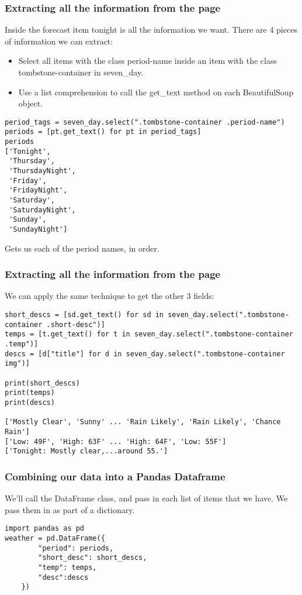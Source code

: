\begin{frame}[fragile]\frametitle{Extracting all the information from the page}
Inside the forecast item tonight is all the information we want. There are 4 pieces of information we can extract:
     \begin{itemize}
    \item    Select all items with the class period-name inside an item with the class tombstone-container in seven\_day.
    \item        Use a list comprehension to call the get\_text method on each BeautifulSoup object.
	    \end{itemize}
	                \begin{lstlisting}
period_tags = seven_day.select(".tombstone-container .period-name")
periods = [pt.get_text() for pt in period_tags]
periods
['Tonight',
 'Thursday',
 'ThursdayNight',
 'Friday',
 'FridayNight',
 'Saturday',
 'SaturdayNight',
 'Sunday',
 'SundayNight']
\end{lstlisting}
Gets us each of the period names, in order.
\end{frame}


\begin{frame}[fragile]\frametitle{Extracting all the information from the page}
We can apply the same technique to get the other 3 fields:

	                \begin{lstlisting}
short_descs = [sd.get_text() for sd in seven_day.select(".tombstone-container .short-desc")]
temps = [t.get_text() for t in seven_day.select(".tombstone-container .temp")]
descs = [d["title"] for d in seven_day.select(".tombstone-container img")]

print(short_descs)
print(temps)
print(descs)

['Mostly Clear', 'Sunny' ... 'Rain Likely', 'Rain Likely', 'Chance Rain']
['Low: 49F', 'High: 63F' ... 'High: 64F', 'Low: 55F']
['Tonight: Mostly clear,...around 55.']
\end{lstlisting}
\end{frame}

\begin{frame}[fragile]\frametitle{Combining our data into a Pandas Dataframe}
We'll call the DataFrame class, and pass in each list of items that we have. We pass them in as part of a dictionary.

	                \begin{lstlisting}
import pandas as pd
weather = pd.DataFrame({
        "period": periods, 
        "short_desc": short_descs, 
        "temp": temps, 
        "desc":descs
    })

\end{lstlisting}
\end{frame}

